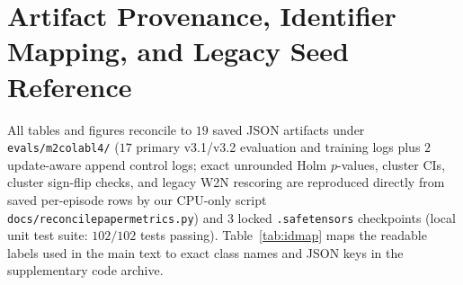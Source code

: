 \documentclass[10pt]{article}
\renewcommand{\_}{\origunderscore\allowbreak}
\begin{document}




\appendix
\section{Artifact Provenance, Identifier Mapping, and Legacy Seed Reference}
\label{app:legacy}

All tables and figures reconcile to $19$ saved JSON artifacts under \texttt{evals/m2\_colab\_l4/} ($17$ primary v3.1/v3.2 evaluation and training logs plus $2$ update-aware append control logs; exact unrounded Holm $p$-values, cluster CIs, cluster sign-flip checks, and legacy W2N rescoring are reproduced directly from saved per-episode rows by our CPU-only script \texttt{docs/reconcile\_paper\_metrics.py}) and $3$ locked \texttt{.safetensors} checkpoints (local unit test suite: $102/102$ tests passing). Table~\ref{tab:idmap} maps the readable labels used in the main text to exact class names and JSON keys in the supplementary code archive.
\end{document}

